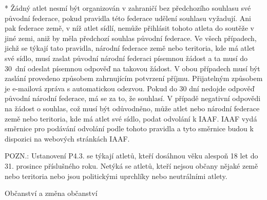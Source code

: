 * Žádný atlet nesmí být organizován v zahraničí bez předchozího souhlasu své původní federace, pokud pravidla této federace udělení souhlasu vyžadují. Ani pak federace země, v níž atlet sídlí, nemůže přihlásit tohoto atleta do soutěže v jiné zemi, aniž by měla předchozí souhlas původní federace. Ve všech případech, jichž se týkají tato pravidla, národní federace země nebo teritoria, kde má atlet své sídlo, musí zaslat původní národní federaci písemnou žádost a ta musí do 30~dní odeslat písemnou odpověď na takovou žádost. V obou případech musí být zaslání provedeno způsobem zahrnujícím potvrzení příjmu. Přijatelným způsobem je e-mailová zpráva s automatickou odezvou. Pokud do 30 dní nedojde odpověď původní národní federace, má se za to, že souhlasí. V případě negativní odpovědi na žádost o souhlas, což musí být odůvodněno, může atlet nebo národní federace země nebo teritoria, kde má atlet své sídlo, podat odvolání k IAAF. IAAF vydá směrnice pro podávání odvolání podle tohoto pravidla a tyto směrnice budou k dispozici na webových stránkách IAAF.
\enditems

POZN.: Ustanovení P4.3. se týkají atletů, kteří dosáhnou věku alespoň 18 let do 31. prosince příslušného roku.
Netýká se atletů, kteří nejsou občany nějaké země nebo teritoria nebo jsou politickými uprchlíky nebo neutrálními atlety.

\secc Občanství a změna občanství


